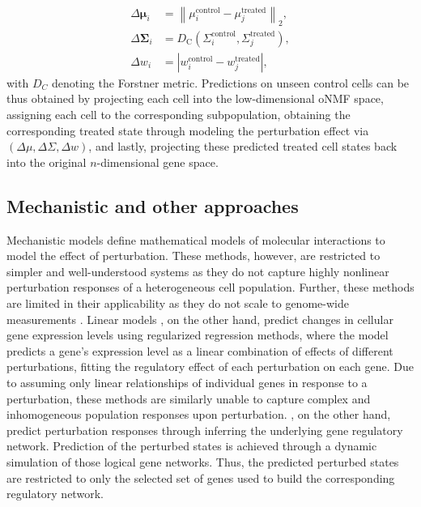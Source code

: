 \begin{align*}
	\Delta \boldsymbol{\mu}_i &=\left\|\mu_i^{\text {control}}-\mu_j^{\text {treated}}\right\|_2, \\
	\Delta \boldsymbol{\Sigma}_i &=D_{\mathrm{C}}\left(\Sigma_i^{\text {control}}, \Sigma_j^{\text {treated}}\right), \\
	\Delta w_i &=\left|w_i^{\text {control}}-w_j^{\text {treated}}\right|,
\end{align*}
with $D_C$ denoting the Forstner metric. Predictions on unseen control cells can be thus obtained by projecting each cell into the low-dimensional oNMF space, assigning each cell to the corresponding subpopulation, obtaining the corresponding treated state through modeling the perturbation effect via $(\Delta \mu, \Delta \Sigma, \Delta w)$, and lastly, projecting these predicted treated cell states back into the original $n$-dimensional gene space.

\subsection{Mechanistic and other approaches}
Mechanistic models \citep{yuan2021, frohlich2018} define mathematical models of molecular interactions to model the effect of perturbation.
These methods, however, are restricted to simpler and well-understood systems as they do not capture highly nonlinear perturbation responses of a heterogeneous cell population. Further, these methods are limited in their applicability as they do not scale to genome-wide measurements \citep{snijder2012, berchtold2018, green2016}.
Linear models \citep{dixit2016, kamimoto2023}, on the other hand,  predict changes in cellular gene expression levels using regularized regression methods, where the model predicts a gene's expression level as a linear combination of effects of different perturbations, fitting the regulatory effect of each perturbation on each gene.
Due to assuming only linear relationships of individual genes in response to a perturbation, these methods are similarly  unable to capture complex and inhomogeneous population responses upon perturbation.
\citet{heydari2022}, on the other hand, predict perturbation responses through inferring the underlying gene regulatory network. Prediction of the perturbed states is achieved through a dynamic simulation of those logical gene networks. Thus, the predicted perturbed states are restricted to only the selected set of genes used to build the corresponding regulatory network.


